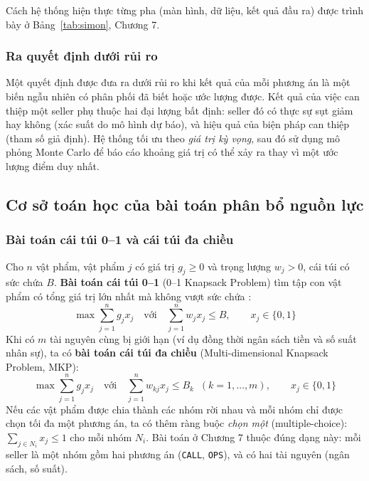 Cách hệ thống hiện thực từng pha (màn hình, dữ liệu, kết quả đầu ra) được trình bày ở Bảng~\ref{tab:simon}, Chương 7.

\subsubsection*{Ra quyết định dưới rủi ro}
Một quyết định được đưa ra dưới rủi ro khi kết quả của mỗi phương án là một biến ngẫu nhiên có phân phối đã biết hoặc ước lượng được. Kết quả của việc can thiệp một seller phụ thuộc hai đại lượng bất định: seller đó có thực sự sụt giảm hay không (xác suất do mô hình dự báo), và hiệu quả của biện pháp can thiệp (tham số giả định). Hệ thống tối ưu theo \emph{giá trị kỳ vọng}, sau đó sử dụng mô phỏng Monte Carlo để báo cáo khoảng giá trị có thể xảy ra thay vì một ước lượng điểm duy nhất.

\subsection{Cơ sở toán học của bài toán phân bổ nguồn lực}
\subsubsection*{Bài toán cái túi 0--1 và cái túi đa chiều}
Cho $n$ vật phẩm, vật phẩm $j$ có giá trị $g_j \ge 0$ và trọng lượng $w_j > 0$, cái túi có sức chứa $B$. \textbf{Bài toán cái túi 0--1} (0--1 Knapsack Problem) tìm tập con vật phẩm có tổng giá trị lớn nhất mà không vượt sức chứa \cite{kellerer2004}:
\begin{equation}
\max \sum_{j=1}^{n} g_j x_j \quad \text{với} \quad \sum_{j=1}^{n} w_j x_j \le B, \qquad x_j \in \{0, 1\}
\end{equation}
Khi có $m$ tài nguyên cùng bị giới hạn (ví dụ đồng thời ngân sách tiền và số suất nhân sự), ta có \textbf{bài toán cái túi đa chiều} (Multi-dimensional Knapsack Problem, MKP):
\begin{equation}
\max \sum_{j=1}^{n} g_j x_j \quad \text{với} \quad \sum_{j=1}^{n} w_{kj} x_j \le B_k \;\; (k = 1, \dots, m), \qquad x_j \in \{0, 1\}
\end{equation}
Nếu các vật phẩm được chia thành các nhóm rời nhau và mỗi nhóm chỉ được chọn tối đa một phương án, ta có thêm ràng buộc \emph{chọn một} (multiple-choice): $\sum_{j \in N_i} x_j \le 1$ cho mỗi nhóm $N_i$. Bài toán ở Chương 7 thuộc đúng dạng này: mỗi seller là một nhóm gồm hai phương án (\texttt{CALL}, \texttt{OPS}), và có hai tài nguyên (ngân sách, số suất).

